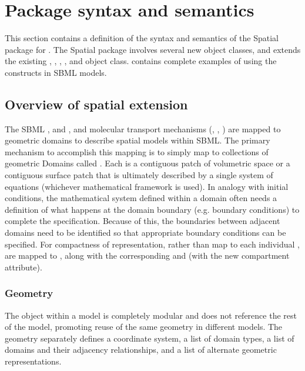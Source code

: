 
\section{Package syntax and semantics}
\label{sec:syntax}
This section contains a definition of the syntax and semantics of the Spatial package for \sbmlthreecore.  The Spatial package involves several new object classes, and extends the existing \Model, \Compartment, \Species, \Reaction, and \Parameter object class.   contains complete examples of using the constructs in SBML models.



\subsection{Overview of spatial extension}
The SBML \Compartment, \Reaction and \Species, and molecular transport mechanisms (\DiffusionCoefficient, \AdvectionCoefficient, \BoundaryCondition) are mapped to geometric domains to describe spatial models within SBML.  The primary mechanism to accomplish this mapping is to simply map \Compartments to collections of geometric Domains called \DomainTypes.  Each \Domain is a contiguous patch of volumetric space or a contiguous surface patch that is ultimately described by a single system of equations (whichever mathematical framework is used).  In analogy with initial conditions, the mathematical system defined within a domain often needs a definition of what happens at the domain boundary (e.g. boundary conditions) to complete the specification.  Because of this, the boundaries between adjacent domains need to be identified so that appropriate boundary conditions can be specified.  For compactness of representation, rather than map to each individual \Domain, \Compartments are mapped to \DomainTypes, along with the corresponding \Species and \Reactions (with the new compartment attribute).

\subsubsection{Geometry}
The \Geometry object within a model is completely modular and does not reference the rest of the model, promoting reuse of the same geometry in different models.  The geometry separately defines a coordinate system, a list of domain types, a list of domains and their adjacency relationships, and a list of alternate geometric representations.

